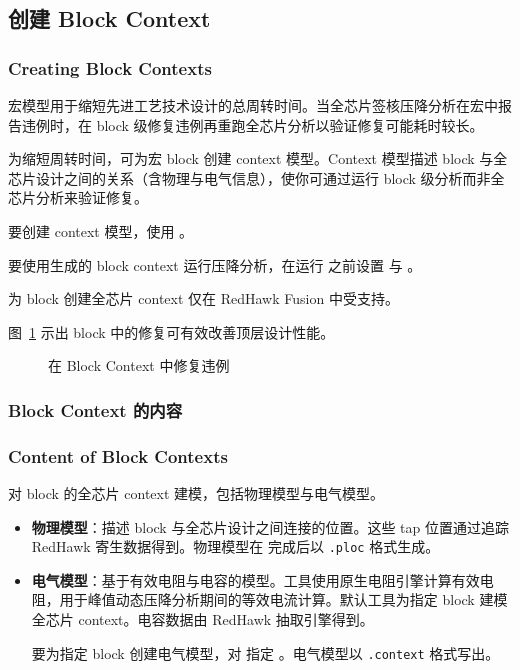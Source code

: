\subsection{创建 Block Context}
\subsubsection*{Creating Block Contexts}

宏模型用于缩短先进工艺技术设计的总周转时间。当全芯片签核压降分析在宏中报告违例时，在 block 级修复违例再重跑全芯片分析以验证修复可能耗时较长。

为缩短周转时间，可为宏 block 创建 context 模型。Context 模型描述 block 与全芯片设计之间的关系（含物理与电气信息），使你可通过运行 block 级分析而非全芯片分析来验证修复。

要创建 context 模型，使用 。

要使用生成的 block context 运行压降分析，在运行  之前设置  与 。

\begin{noteBox}
为 block 创建全芯片 context 仅在 RedHawk Fusion 中受支持。
\end{noteBox}

图~\ref{fig:block-ctx} 示出 block 中的修复可有效改善顶层设计性能。

\begin{figure}[htbp]
\centering
{}
\caption{在 Block Context 中修复违例}
\label{fig:block-ctx}
\end{figure}

\subsubsection{Block Context 的内容}
\subsubsection*{Content of Block Contexts}

 对 block 的全芯片 context 建模，包括物理模型与电气模型。

\begin{itemize}
  \item \textbf{物理模型}：描述 block 与全芯片设计之间连接的位置。这些 tap 位置通过追踪 RedHawk 寄生数据得到。物理模型在  完成后以 \texttt{.ploc} 格式生成。
  \item \textbf{电气模型}：基于有效电阻与电容的模型。工具使用原生电阻引擎计算有效电阻，用于峰值动态压降分析期间的等效电流计算。默认工具为指定 block 建模全芯片 context。电容数据由 RedHawk 抽取引擎得到。

要为指定 block 创建电气模型，对  指定 。电气模型以 \texttt{.context} 格式写出。
\end{itemize}

